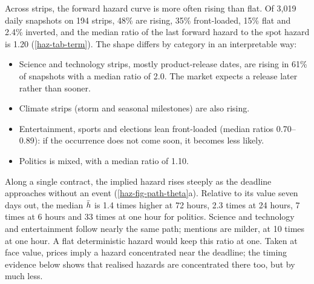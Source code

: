 Across strips, the forward hazard curve is more often rising than flat. Of 3{,}019 daily snapshots
on 194 strips, 48\% are rising, 35\% front-loaded, 15\% flat and 2.4\% inverted, and the median ratio
of the last forward hazard to the spot hazard is 1.20 (\cref{haz-tab-term}).
The shape differs by category in an interpretable way:
\begin{itemize}
\item Science and technology strips, mostly product-release dates, are rising in 61\% of snapshots
  with a median ratio of 2.0. The market expects a release later rather than sooner.
\item Climate strips (storm and seasonal milestones) are also rising.
\item Entertainment, sports and elections lean front-loaded (median ratios 0.70--0.89): if the
  occurrence does not come soon, it becomes less likely.
\item Politics is mixed, with a median ratio of 1.10.
\end{itemize}

Along a single contract, the implied hazard rises steeply as the deadline approaches without an event
(\cref{haz-fig-path-theta}a). Relative to its value seven days out, the median $\bar h$ is 1.4 times
higher at 72 hours, 2.3 times at 24 hours, 7 times at 6 hours and 33 times at one hour for politics.
Science and technology and entertainment follow nearly the same path; mentions are milder, at 10
times at one hour.
A flat deterministic hazard would keep this ratio at one. Taken at face value, prices imply a hazard
concentrated near the deadline; the timing evidence below shows that realised hazards are concentrated
there too, but by much less.


